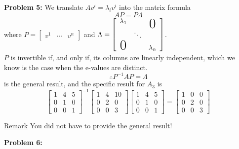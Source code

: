 \documentclass[letterpaper]{article}
\begin{document}
\noindent \textbf{Problem 5:}
We translate $Av^i = \lambda_i v^i$ into the matrix formula
$$AP = P\Lambda$$
where $P=\left[\begin{array}{c|c|c} v^1 & \cdots & v^n\end{array}\right]$ and
$\Lambda =\left[\begin{array}{ccc} \lambda_1 & &\raisebox{-1.7ex}[0pt]{\huge0} \\
                                   & \ddots & \\
                                  \text{\huge0} & & \lambda_n
                                  \end{array}\right]$. \medskip \\
$P$ is invertible if, and only if, its columns are linearly independent, which we know is the case when the e-values are distinct.
$$\therefore P^{-1}AP=\Lambda$$
is the general result, and the specific result for $A_3$ is
$$\left[ \begin{array}{ccc} 1 & 4 & 5 \\ 0 & 1 & 0 \\ 0& 0& 1 \end{array} \right] ^{-1}
    \left[ \begin{array}{ccc} 1 & 4 & 10 \\ 0 & 2 & 0 \\ 0& 0& 3 \end{array} \right]
    \left[ \begin{array}{ccc} 1 & 4 & 5 \\ 0 & 1 & 0 \\ 0& 0& 1 \end{array} \right]=
    \left[ \begin{array}{ccc} 1 & 0 & 0 \\ 0 & 2 & 0 \\ 0& 0& 3 \end{array} \right]$$

\underline{Remark} You did not have to provide the general result!

\bigskip

\noindent \textbf{Problem 6:}
\end{document}
